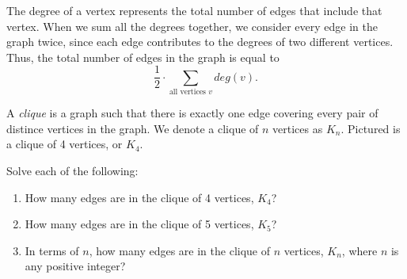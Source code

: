 \documentclass[11pt]{article}
\begin{document}
\begin{solution}
The degree of a vertex represents the total number of edges that include that vertex. When we sum all the degrees together,
we consider every edge in the graph twice, since each edge contributes to the degrees of two different vertices. Thus, the total number
of edges in the graph is equal to 
\[\frac{1}{2} \cdot \sum_{\text{all vertices $v$}} deg(v).\]
\end{solution}

\begin{definition}
\label{def:clique}
A \textit{clique} is a graph such that there is exactly one edge covering every pair of distince vertices in the graph.
We denote a clique of $n$ vertices as $K_n$.
Pictured is a clique of 4 vertices, or $K_4$.
\begin{center}
\end{center}
\end{definition}

\begin{problem} %
Solve each of the following:
\begin{enumerate}[label=(\alph*)]
\item How many edges are in the clique of 4 vertices, $K_4$?
\item How many edges are in the clique of 5 vertices, $K_5$?
\item In terms of $n$, how many edges are in the clique of $n$ vertices, $K_n$, where $n$ is any positive integer?
\end{enumerate}
\end{problem}
\end{document}

